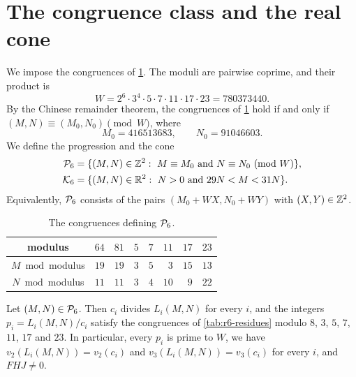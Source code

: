 \section{The congruence class and the real cone}\label{sec:r6-progression}

We impose the congruences of \cref{tab:r6-crt}. The moduli are pairwise coprime, and their product is
\[
W=2^6\cdot3^4\cdot5\cdot7\cdot11\cdot17\cdot23=780373440.
\]
By the Chinese remainder theorem, the congruences of \cref{tab:r6-crt} hold if and only if $(M,N)\equiv(M_0,N_0)\pmod W$, where
\begin{equation}\label{r6:crt}
M_0=416513683,\qquad N_0=91046603.
\end{equation}
We define the progression and the cone
\begin{equation}\label{r6:cone}
\begin{aligned}
\cP_6&=\{(M,N)\in\Z^2:\ M\equiv M_0\ \text{and}\ N\equiv N_0\ (\mathrm{mod}\ W)\},\\
\cK_6&=\{(M,N)\in\R^2:\ N>0\ \text{and}\ 29N<M<31N\}.
\end{aligned}
\end{equation}
Equivalently, $\mathcal P_6$ consists of the pairs $(M_0+WX,N_0+WY)$ with $(X,Y)\in\mathbb Z^2$.

\begin{table}[htbp]
\centering
\caption{The congruences defining $\mathcal P_6$.}
\label{tab:r6-crt}
\begin{tabular}{crrrrrrr}
\toprule
modulus & $64$ & $81$ & $5$ & $7$ & $11$ & $17$ & $23$\\
\midrule
$M\bmod{}$modulus & $19$ & $19$ & $3$ & $5$ & $3$ & $15$ & $13$\\
$N\bmod{}$modulus & $11$ & $11$ & $3$ & $4$ & $10$ & $9$ & $22$\\
\bottomrule
\end{tabular}
\end{table}

\begin{lemma}\label{lem:r6-residues}
Let $(M,N)\in\mathcal P_6$. Then $c_i$ divides $L_i(M,N)$ for every $i$, and the integers $p_i=L_i(M,N)/c_i$ satisfy the congruences of \cref{tab:r6-residues} modulo $8$, $3$, $5$, $7$, $11$, $17$ and $23$. In particular, every $p_i$ is prime to $W$, we have $v_2(L_i(M,N))=v_2(c_i)$ and $v_3(L_i(M,N))=v_3(c_i)$ for every $i$, and $FHJ\ne0$.
\end{lemma}

